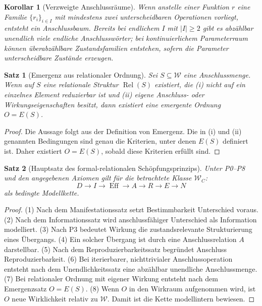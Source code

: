 \documentclass[11pt,a4paper]{article}
\newtheorem{satz}{Satz}[section]
\newtheorem{korollar}{Korollar}[section]
\theoremstyle{remark}
\newcommand{\W}{\mathcal{W}}
\newcommand{\Eff}{\operatorname{Eff}}
\newcommand{\Rel}{\operatorname{Rel}}
\begin{document}
\begin{korollar}[Verzweigte Anschlussräume]
Wenn anstelle einer Funktion $r$ eine Familie $\{r_i\}_{i\in I}$ mit mindestens zwei unterscheidbaren Operationen vorliegt, entsteht ein Anschlussbaum. Bereits bei endlichem $I$ mit $|I|\geq 2$ gibt es abzählbar unendlich viele endliche Anschlusswörter; bei kontinuierlichem Parameterraum können überabzählbare Zustandsfamilien entstehen, sofern die Parameter unterscheidbare Zustände erzeugen.
\end{korollar}

\begin{satz}[Emergenz aus relationaler Ordnung]
Sei $S\subseteq\W$ eine Anschlussmenge. Wenn auf $S$ eine relationale Struktur $\Rel(S)$ existiert, die (i) nicht auf ein einzelnes Element reduzierbar ist und (ii) eigene Anschluss- oder Wirkungseigenschaften besitzt, dann existiert eine emergente Ordnung $O=E(S)$.
\end{satz}
\begin{proof}
Die Aussage folgt aus der Definition von Emergenz. Die in (i) und (ii) genannten Bedingungen sind genau die Kriterien, unter denen $E(S)$ definiert ist. Daher existiert $O=E(S)$, sobald diese Kriterien erfüllt sind.
\end{proof}

\begin{satz}[Hauptsatz des formal-relationalen Schöpfungsprinzips]
Unter P0--P8 und den angegebenen Axiomen gilt für die betrachtete Klasse $\W_C$:
\[
D \rightarrow I \rightarrow \Eff \rightarrow A \rightarrow R \rightarrow E \rightarrow N
\]
als bedingte Modellkette.
\end{satz}
\begin{proof}
(1) Nach dem Manifestationssatz setzt Bestimmbarkeit Unterschied voraus. (2) Nach dem Informationssatz wird anschlussfähiger Unterschied als Information modelliert. (3) Nach P3 bedeutet Wirkung die zustandsrelevante Strukturierung eines Übergangs. (4) Ein solcher Übergang ist durch eine Anschlussrelation $A$ darstellbar. (5) Nach dem Reproduzierbarkeitssatz begründet Anschluss Reproduzierbarkeit. (6) Bei iterierbarer, nichttrivialer Anschlussoperation entsteht nach dem Unendlichkeitssatz eine abzählbar unendliche Anschlussmenge. (7) Bei relationaler Ordnung mit eigener Wirkung entsteht nach dem Emergenzsatz $O=E(S)$. (8) Wenn $O$ in den Wirkraum aufgenommen wird, ist $O$ neue Wirklichkeit relativ zu $\W$. Damit ist die Kette modellintern bewiesen.
\end{proof}
\end{document}
